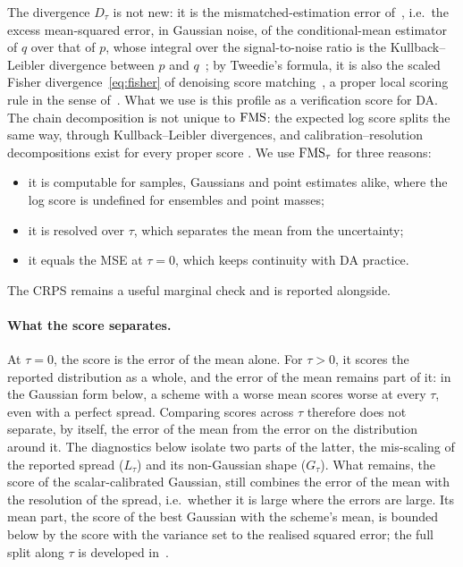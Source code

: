 The divergence $D_\tau$ is not new: it is the mismatched-estimation error
of~\cite{verdu_mismatched_2010}, i.e.\ the excess mean-squared error, in Gaussian noise, of the
conditional-mean estimator of $q$ over that of $p$, whose integral over the signal-to-noise
ratio is the Kullback--Leibler divergence between $p$ and $q$~\cite{guo_mutual_2005,verdu_mismatched_2010};
by Tweedie's formula, it is also the scaled Fisher divergence~\eqref{eq:fisher} of denoising score
matching~\cite{hyvarinen_estimation_2005,vincent_connection_2011}, a proper local scoring rule in the
sense of~\cite{parry_proper_2012}. What we use is this profile as a verification score for DA.
The chain decomposition is not unique to $\mathrm{FMS}$: the expected log score splits
the same way, through Kullback--Leibler divergences, and calibration--resolution
decompositions exist for every proper score \cite{brocker_reliability_2009,gneiting_strictly_2007}. We use $\mathrm{FMS}_\tau$ for three reasons:
\begin{itemize}
  \item it is computable for samples, Gaussians and point estimates alike, where
    the log score is undefined for ensembles and point masses;
  \item it is resolved over $\tau$, which separates the mean from the uncertainty;
  \item it equals the MSE at $\tau = 0$, which keeps continuity with DA practice.
\end{itemize}
The CRPS remains a useful marginal check and is reported alongside.


\paragraph{What the score separates.} At $\tau = 0$, the score is the error of the mean
alone. For $\tau > 0$, it scores the reported distribution as a whole, and the error of the
mean remains part of it: in the Gaussian form below, a scheme with a worse mean scores worse at
every $\tau$, even with a perfect spread. Comparing scores across $\tau$ therefore does not
separate, by itself, the error of the mean from the error on the distribution around it. The
diagnostics below isolate two parts of the latter, the mis-scaling of the reported spread
($L_\tau$) and its non-Gaussian shape ($G_\tau$). What remains, the score of the
scalar-calibrated Gaussian, still combines the error of the mean with the resolution of the
spread, i.e.\ whether it is large where the errors are large. Its mean part, the score of the
best Gaussian with the scheme's mean, is bounded below by the score with the variance set to the
realised squared error; the full split along $\tau$ is developed in~\cite{fablet_flow_2026}.

